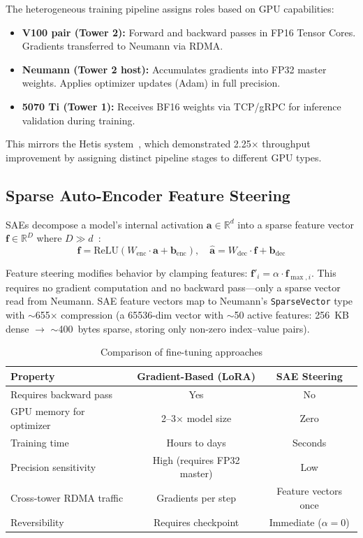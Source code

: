 \documentclass[11pt,letterpaper]{article}
\theoremstyle{definition}
\begin{document}
The heterogeneous training pipeline assigns roles based on GPU capabilities:
\begin{itemize}
    \item \textbf{V100 pair (Tower 2):} Forward and backward passes in FP16 Tensor Cores. Gradients transferred to Neumann via RDMA.
    \item \textbf{Neumann (Tower 2 host):} Accumulates gradients into FP32 master weights. Applies optimizer updates (Adam) in full precision.
    \item \textbf{5070 Ti (Tower 1):} Receives BF16 weights via TCP/gRPC for inference validation during training.
\end{itemize}

This mirrors the Hetis system~\cite{hetis2024}, which demonstrated 2.25$\times$ throughput improvement by assigning distinct pipeline stages to different GPU types.

\subsection{Sparse Auto-Encoder Feature Steering}

SAEs decompose a model's internal activation $\mathbf{a} \in \mathbb{R}^d$ into a sparse feature vector $\mathbf{f} \in \mathbb{R}^D$ where $D \gg d$~\cite{cunningham2023sae, templeton2024scaling}:
\begin{equation}
    \mathbf{f} = \text{ReLU}(W_{\text{enc}} \cdot \mathbf{a} + \mathbf{b}_{\text{enc}}), \quad
    \hat{\mathbf{a}} = W_{\text{dec}} \cdot \mathbf{f} + \mathbf{b}_{\text{dec}}
\end{equation}

Feature steering modifies behavior by clamping features: $\mathbf{f}'_i = \alpha \cdot \mathbf{f}_{\max,i}$. This requires no gradient computation and no backward pass---only a sparse vector read from Neumann. SAE feature vectors map to Neumann's \texttt{SparseVector} type with $\sim$655$\times$ compression (a 65536-dim vector with $\sim$50 active features: 256~KB dense $\to$ $\sim$400~bytes sparse, storing only non-zero index--value pairs).

\begin{table}[htbp]
\centering
\caption{Comparison of fine-tuning approaches}
\label{tab:finetuning-comparison}
\begin{tabular}{@{}lcc@{}}
\toprule
\textbf{Property} & \textbf{Gradient-Based (LoRA)} & \textbf{SAE Steering} \\
\midrule
Requires backward pass & Yes & No \\
GPU memory for optimizer & 2--3$\times$ model size & Zero \\
Training time & Hours to days & Seconds \\
Precision sensitivity & High (requires FP32 master) & Low \\
Cross-tower RDMA traffic & Gradients per step & Feature vectors once \\
Reversibility & Requires checkpoint & Immediate ($\alpha = 0$) \\
\bottomrule
\end{tabular}
\end{table}
\end{document}
